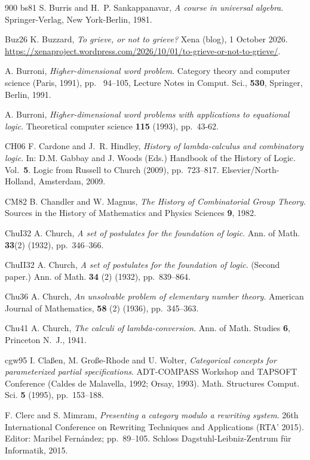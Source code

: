 \begin{thebibliography}{900}
\bibitem%
{bs81} S. Burris and H.~P. Sankappanavar, \emph{A course in universal algebra}. Springer-Verlag, New York-Berlin, 1981.

\bibitem%
{Buz26} K. Buzzard, \emph{To grieve, or not to grieve?} Xena (blog), 1 October 2026. \url{https://xenaproject.wordpress.com/2026/10/01/to-grieve-or-not-to-grieve/}.

A. Burroni, \emph{Higher-dimensional word problem.} Category theory and computer science (Paris, 1991), pp.~ 94--105, Lecture Notes in Comput. Sci., \textbf{530}, Springer, Berlin, 1991.

A. Burroni, \emph{Higher-dimensional word problems with applications to equational logic}. Theoretical computer science \textbf{115} (1993), pp.~43-62.

\bibitem%
{CH06} F. Cardone and J.~R. Hindley, \emph{History of lambda-calculus and combinatory logic}. In: D.M. Gabbay and J. Woods (Eds.) Handbook of the History of Logic.  Vol.~\textbf{5}. Logic from Russell to Church (2009), pp.~723--817. Elsevier/North-Holland, Amsterdam, 2009.

\bibitem%
{CM82} B. Chandler and W. Magnus, \emph{The History of Combinatorial Group Theory}. Sources in the History of Mathematics and Physics Sciences \textbf{9}, 1982. 

\bibitem%
{ChuI32} A. Church, \emph{A set of postulates for the foundation of logic}. Ann. of Math. \textbf{33}(2) (1932), pp.~346--366.

\bibitem%
{ChuII32} A. Church, \emph{A set of postulates for the foundation of logic}. (Second paper.)  Ann. of Math. \textbf{34} (2) (1932), pp.~839--864.

\bibitem%
{Chu36} A. Church, \emph{An unsolvable problem of elementary number theory}. American Journal of Mathematics, \textbf{58} (2) (1936), pp.~345--363.

\bibitem%
{Chu41} A. Church, \emph{The calculi of lambda-conversion}. Ann. of Math. Studies \textbf{6}, Princeton N.~J., 1941.

\bibitem%
{cgw95} I. Cla{\ss}en, M. Gro{\ss}e-Rhode and U. Wolter, \emph{Categorical concepts for parameterized partial specifications}. ADT-COMPASS Workshop and TAPSOFT Conference (Caldes de Malavella, 1992; Orsay, 1993). Math. Structures Comput. Sci. \textbf{5} (1995), pp.~153--188.

F. Clerc  and S. Mimram, \emph{Presenting a category modulo a rewriting system}. 26th International Conference on Rewriting Techniques and Applications (RTA' 2015). Editor: Maribel Fern\'{a}ndez; pp.~89--105.  Schloss Dagstuhl-Leibniz-Zentrum f\"ur Informatik, 2015.


\end{thebibliography}
